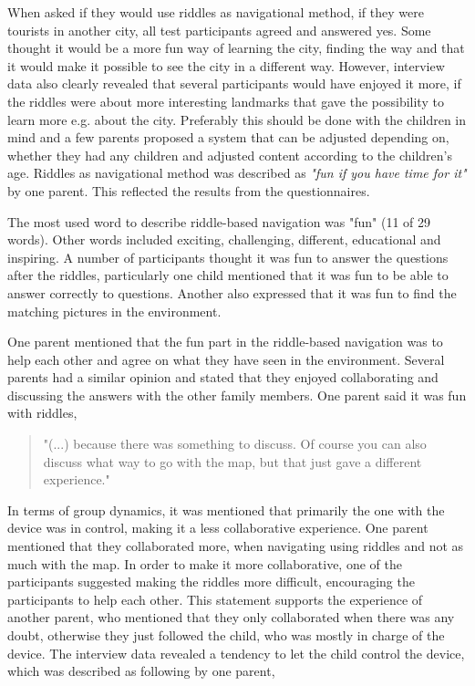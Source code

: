 When asked if they would use riddles as navigational method, if they were tourists in another city, all test participants agreed and answered yes. Some thought it would be a more fun way of learning the city, finding the way and that it would make it possible to see the city in a different way. However, interview data also clearly revealed that several participants would have enjoyed it more, if the riddles were about more interesting landmarks that gave the possibility to learn more e.g. about the city. Preferably this should be done with the children in mind and a few parents proposed a system that can be adjusted depending on, whether they had any children and adjusted content according to the children’s age. Riddles as navigational method was described as \textit{"fun if you have time for it"} by one parent. This reflected the results from the questionnaires. 

The most used word to describe riddle-based navigation was "fun" (11 of 29 words). Other words included exciting, challenging, different, educational and inspiring. A number of participants thought it was fun to answer the questions after the riddles, particularly one child mentioned that it was fun to be able to answer correctly to questions. Another also expressed that it was fun to find the matching pictures in the environment. 

One parent mentioned that the fun part in the riddle-based navigation was to help each other and agree on what they have seen in the environment. Several parents had a similar opinion and stated that they enjoyed collaborating and discussing the answers with the other family members. One parent said it was fun with riddles, 

\begin{quote}
    "(...) because there was something to discuss. Of course you can also discuss what way to go with the map, but that just gave a different experience."
\end{quote}

In terms of group dynamics, it was mentioned that primarily the one with the device was in control, making it a less collaborative experience. One parent mentioned that they collaborated more, when navigating using riddles and not as much with the map. In order to make it more collaborative, one of the participants suggested making the riddles more difficult, encouraging the participants to help each other. This statement supports the experience of another parent, who mentioned that they only collaborated when there was any doubt, otherwise they just followed the child, who was mostly in charge of the device. The interview data revealed a tendency to let the child control the device, which was described as following by one parent,  

